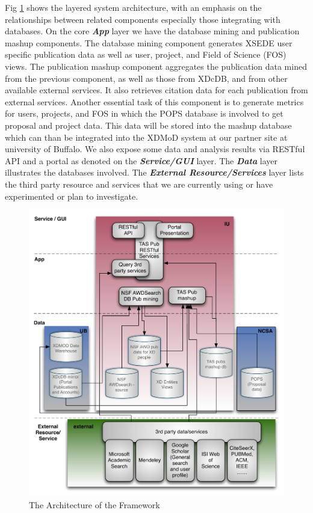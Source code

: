 \documentclass{sig-alternate}
\begin{document}
Fig \ref{F:tas-arch} shows the layered system architecture, with an
emphasis on the relationships between related components especially
those integrating with databases. On the core \emph{\textbf{App}}
layer we have the database mining and publication mashup
components. The database mining component generates XSEDE user
specific publication data as well as user, project, and Field of
Science (FOS) views. The publication mashup component aggregates the
publication data mined from the previous component, as well as those
from XDcDB, and from other available external services. It also
retrieves citation data for each publication from external
services. Another essential task of this component is to generate
metrics for users, projects, and FOS in which the POPS database is
involved to get proposal and project data. This data will be stored
into the mashup database which can than be integrated into the XDMoD
\cite{Furlani:2013:UXF:2484762.2484763} system at our partner site at
university of Buffalo. We also expose some data and analysis results
via RESTful API and a portal as denoted on the
\emph{\textbf{Service/GUI}} layer. The \emph{\textbf{Data}} layer
illustrates the databases involved. The \emph{\textbf{External
    Resource/Services}} layer lists the third party resource and
services that we are currently using or have experimented or plan to
investigate.

\begin{figure}[htb] 
  \centering 
    \includegraphics[width=1.0\columnwidth]{images/tas-arch.pdf} 
  \caption{The Architecture of the Framework}\label{F:tas-arch} 
\end{figure} 
\end{document}
